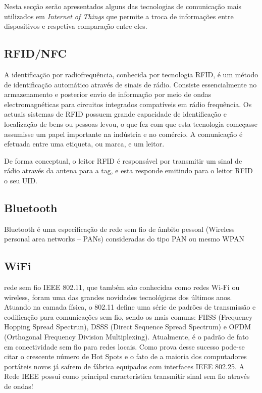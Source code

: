 Nesta secção serão apresentados alguns das tecnologias de comunicação mais utilizados em \textit{Internet of Things} que permite a troca de informações entre dispositivos e respetiva comparação entre eles. 



\subsection{RFID/NFC}

A identificação por radiofrequência, conhecida por tecnologia \ac{RFID}, é um método de identificação automático através de sinais de rádio. Consiste essencialmente no armazenamento e posterior envio de informação por meio de ondas electromagnéticas para circuitos integrados compatíveis em rádio frequência.  
Os actuais sistemas de \ac{RFID} possuem grande capacidade de identificação e localização de bens ou pessoas levou, o que fez com que esta tecnologia começasse assumisse um papel importante na indústria e no comércio. A comunicação é efetuada entre uma etiqueta, ou marca, e um leitor.


De forma conceptual, o leitor \ac{RFID} é responsável por transmitir um sinal de rádio através da antena para a tag, e esta responde emitindo para o leitor \ac{RFID} o seu \ac{UID}.


\subsection{Bluetooth}

Bluetooth é uma especificação de rede sem fio de âmbito pessoal (Wireless personal area networks – PANs) consideradas do tipo PAN ou mesmo WPAN


\subsection{WiFi}

rede sem fio IEEE 802.11, que também são conhecidas como redes Wi-Fi ou wireless, foram uma das grandes novidades tecnológicas dos últimos anos. Atuando na camada física, o 802.11 define uma série de padrões de transmissão e codificação para comunicações sem fio, sendo os mais comuns: FHSS (Frequency Hopping Spread Spectrun), DSSS (Direct Sequence Spread Spectrum) e OFDM (Orthogonal Frequency Division Multiplexing). Atualmente, é o padrão de fato em conectividade sem fio para redes locais. Como prova desse sucesso pode-se citar o crescente número de Hot Spots e o fato de a maioria dos computadores portáteis novos já saírem de fábrica equipados com interfaces IEEE 802.25. A Rede IEEE possui como principal característica transmitir sinal sem fio através de ondas!


